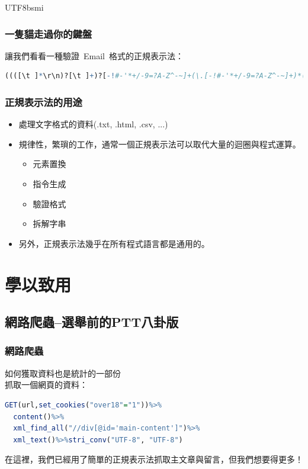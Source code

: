 \documentclass[utf8]{beamer}
\begin{document}
\begin{CJK}{UTF8}{bsmi}
\begin{frame}[fragile]
\frametitle{一隻貓走過你的鍵盤}
讓我們看看一種驗證\ Email\ 格式的正規表示法：
\begin{lstlisting}[language=R,identifierstyle=\color{blue},stringstyle=\color{orange},keywordstyle=\color{green!60!black}\bfseries]
((([\t ]*\r\n)?[\t ]+)?[-!#-'*+/-9=?A-Z^-~]+(\.[-!#-'*+/-9=?A-Z^-~]+)*(([\t ]*\r\n)?[\t ]+)?|(([\t ]*\r\n)?[\t ]+)?"(((([\t ]*\r\n)?[\t ]+)?([]!#-[^-~]|(\\[\t -~])))+(([\t ]*\r\n)?[\t ]+)?|(([\t ]*\r\n)?[\t ]+)?)"(([\t ]*\r\n)?[\t ]+)?)@((([\t ]*\r\n)?[\t ]+)?[-!#-'*+/-9=?A-Z^-~]+(\.[-!#-'*+/-9=?A-Z^-~]+)*(([\t ]*\r\n)?[\t ]+)?|(([\t ]*\r\n)?[\t ]+)?\[((([\t ]*\r\n)?[\t ]+)?[!-Z^-~])*(([\t ]*\r\n)?[\t ]+)?](([\t ]*\r\n)?[\t ]+)?)
\end{lstlisting}
\end{frame}

\begin{frame}[fragile]
\frametitle{正規表示法的用途}
\begin{itemize}
\item 處理文字格式的資料(.txt, .html, .csv, ...)
\item 規律性，繁瑣的工作，通常一個正規表示法可以取代大量的迴圈與程式運算。\\
    \begin{itemize}
    \item 元素置換
    \item 指令生成
    \item 驗證格式
    \item 拆解字串
    \end{itemize}
\item 另外，正規表示法幾乎在所有程式語言都是通用的。
\end{itemize}
\end{frame}

\section{學以致用}
\subsection{網路爬蟲–選舉前的PTT八卦版}
\begin{frame}[fragile]
\frametitle{網路爬蟲}
如何獲取資料也是統計的一部份\\
抓取一個網頁的資料：
\begin{lstlisting}[language=R,identifierstyle=\color{blue},stringstyle=\color{orange},keywordstyle=\color{green!60!black}\bfseries]
GET(url,set_cookies("over18"="1"))%>%
  content()%>%
  xml_find_all("//div[@id='main-content']")%>%
  xml_text()%>%stri_conv("UTF-8", "UTF-8")
\end{lstlisting}
在這裡，我們已經用了簡單的正規表示法抓取主文章與留言，但我們想要得更多！
\end{frame}


\end{CJK}
\end{document}
